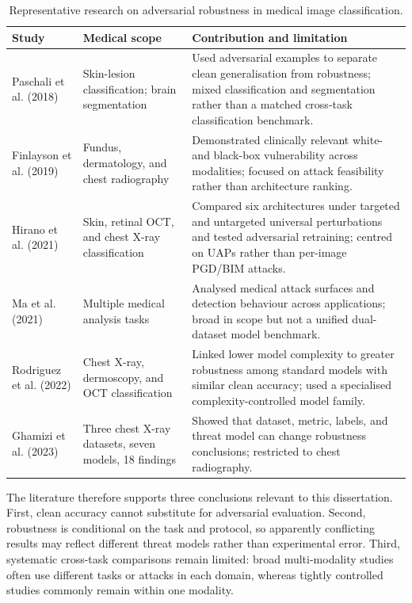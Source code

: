 \documentclass[12pt,a4paper,oneside]{report}
\begin{document}
\begin{table}[htbp]
  \centering
  \caption{Representative research on adversarial robustness in medical image classification.}
  \label{tab:medical-robustness-literature}
  \small
  \begin{tabularx}{\textwidth}{p{2.55cm} p{3.55cm} X}
    \toprule
    Study & Medical scope & Contribution and limitation \\
    \midrule
    Paschali et al. (2018) & Skin-lesion classification; brain segmentation & Used adversarial examples to separate clean generalisation from robustness; mixed classification and segmentation rather than a matched cross-task classification benchmark. \\
    Finlayson et al. (2019) & Fundus, dermatology, and chest radiography & Demonstrated clinically relevant white- and black-box vulnerability across modalities; focused on attack feasibility rather than architecture ranking. \\
    Hirano et al. (2021) & Skin, retinal OCT, and chest X-ray classification & Compared six architectures under targeted and untargeted universal perturbations and tested adversarial retraining; centred on UAPs rather than per-image PGD/BIM attacks. \\
    Ma et al. (2021) & Multiple medical analysis tasks & Analysed medical attack surfaces and detection behaviour across applications; broad in scope but not a unified dual-dataset model benchmark. \\
    Rodriguez et al. (2022) & Chest X-ray, dermoscopy, and OCT classification & Linked lower model complexity to greater robustness among standard models with similar clean accuracy; used a specialised complexity-controlled model family. \\
    Ghamizi et al. (2023) & Three chest X-ray datasets, seven models, 18 findings & Showed that dataset, metric, labels, and threat model can change robustness conclusions; restricted to chest radiography. \\
    \bottomrule
  \end{tabularx}
\end{table}

The literature therefore supports three conclusions relevant to this dissertation. First, clean accuracy cannot substitute for adversarial evaluation. Second, robustness is conditional on the task and protocol, so apparently conflicting results may reflect different threat models rather than experimental error. Third, systematic cross-task comparisons remain limited: broad multi-modality studies often use different tasks or attacks in each domain, whereas tightly controlled studies commonly remain within one modality.
\end{document}
